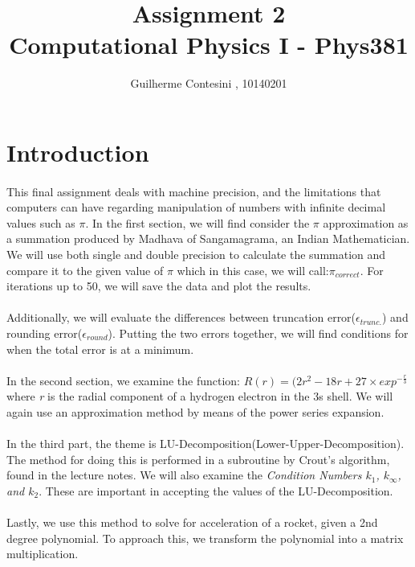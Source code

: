 \documentclass[twocolumn]{article}
\title{Assignment 2\\Computational Physics I - Phys381}
\author{Guilherme Contesini , 10140201}
\begin{document}
\maketitle
\date{}

\section{Introduction}
\paragraph{}
This final assignment deals with machine precision, and the limitations that computers can have regarding manipulation of numbers with infinite decimal values such as $\pi$. In the first section, we will find consider the $\pi$ approximation as a summation produced by Madhava of Sangamagrama, an Indian Mathematician. We will use both single and double precision to calculate the summation and compare it to the given value of $\pi$ which in this case, we will call:$\pi_{correct}$. For iterations up to 50, we will save the data and plot the results. 
\paragraph{}
Additionally, we will evaluate the differences between truncation error($\epsilon_{trunc.}$) and rounding error($\epsilon_{round}$). Putting the two errors together, we will find conditions for when the total error is at a minimum. 
\paragraph{}
In the second section, we examine the function: $R(r)=(2r^2-18r+27 \times exp^{-\frac{r}{3}}$ where \textit{r} is the radial component of a hydrogen electron in the 3s shell. We will again use an approximation method by means of the power series expansion. 
\paragraph{}
In the third part, the theme is LU-Decomposition(Lower-Upper-Decomposition). The method for doing this is performed in a subroutine by Crout's algorithm, found in the lecture notes. We will also examine the \textit{Condition Numbers $k_1$, $k_{\infty}$, and $k_2$}. These are important in accepting the values of the LU-Decomposition.
\paragraph{}
Lastly, we use this method to solve for acceleration of a rocket, given a 2nd degree polynomial. To approach this, we transform the polynomial into a matrix multiplication.
\end{document}
